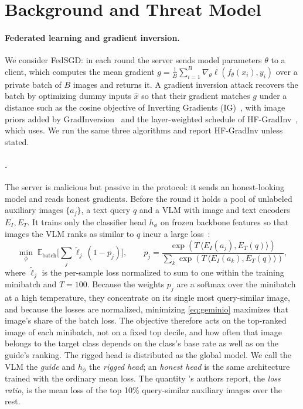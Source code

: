 \section{Background and Threat Model}
\label{sec:background}

\paragraph{Federated learning and gradient inversion.}
We consider FedSGD: in each round the server sends model parameters $\theta$ to a client, which computes the mean gradient $g=\frac{1}{B}\sum_{i=1}^{B}\nabla_\theta \ell(f_\theta(x_i),y_i)$ over a private batch of $B$ images and returns it.
A gradient inversion attack recovers the batch by optimizing dummy inputs $\hat{x}$ so that their gradient matches $g$ under a distance such as the cosine objective of Inverting Gradients (IG)~\cite{ig2020}, with image priors added by GradInversion~\cite{gradinversion2021} and the layer-weighted schedule of HF-GradInv~\cite{hfgradinv2024}, which \geminio uses.
We run the same three algorithms and report HF-GradInv unless stated.

\paragraph{\geminio.}
The server is malicious but passive in the protocol: it sends an honest-looking model and reads honest gradients.
Before the round it holds a pool of unlabeled auxiliary images $\{a_j\}$, a text query $q$ and a VLM with image and text encoders $E_I,E_T$.
It trains only the classifier head $h_\phi$ on frozen backbone features so that images the VLM ranks as similar to $q$ incur a large loss~\cite{geminio2024}:
\begin{equation}
\min_\phi \; \mathbb{E}_{\text{batch}}\Big[\textstyle\sum_j \tilde{\ell}_j\,(1-p_j)\Big],\qquad
p_j=\frac{\exp(T\,\langle E_I(a_j),E_T(q)\rangle)}{\sum_{k}\exp(T\,\langle E_I(a_k),E_T(q)\rangle)},
\label{eq:geminio}
\end{equation}
where $\tilde{\ell}_j$ is the per-sample loss normalized to sum to one within the training minibatch and $T=100$. Because the weights $p_j$ are a softmax over the minibatch at a high temperature, they concentrate on its single most query-similar image, and because the losses are normalized, minimizing \cref{eq:geminio} maximizes that image's share of the batch loss. The objective therefore acts on the top-ranked image of each minibatch, not on a fixed top decile, and how often that image belongs to the target class depends on the class's base rate as well as on the guide's ranking.
The rigged head is distributed as the global model.
We call the VLM the \emph{guide} and $h_\phi$ the \emph{rigged head}; an \emph{honest head} is the same architecture trained with the ordinary mean loss.
The quantity \geminio's authors report, the \emph{loss ratio}, is the mean loss of the top 10\% query-similar auxiliary images over the rest.

